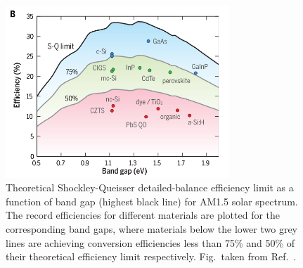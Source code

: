\documentclass[11pt, twoside]{report}
\begin{document}
\begin{figure}[h!]
  \centering
    \includegraphics[width=0.75\textwidth]{figures/SQ_new.png}
    \caption[Theoretical Shockley-Queisser detailed-balance efficiency limit as a function of optical band gap (highest black line) for AM1.5 solar spectrum. The record efficiencies for different materials are plotted for the corresponding band gaps, where materials below the lower two grey lines are achieving conversion efficiencies less than 75\% and 50\% of their theoretical efficiency limit respectively.]{Theoretical Shockley-Queisser detailed-balance efficiency limit \cite{SQ_1961} as a function of band gap (highest black line) for AM1.5 solar spectrum. The record efficiencies for different materials are plotted for the corresponding band gaps, where materials below the lower two grey lines are achieving conversion efficiencies less than 75\% and 50\% of their theoretical efficiency limit respectively. Fig.~taken from Ref.~.}
  \label{SQ}
\end{figure}
\end{document}
